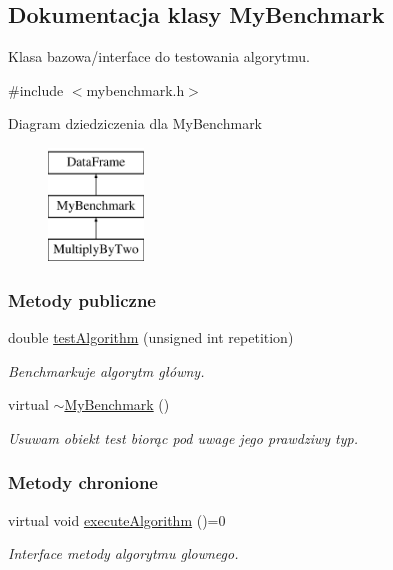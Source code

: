 \hypertarget{class_my_benchmark}{\subsection{Dokumentacja klasy My\-Benchmark}
\label{class_my_benchmark}
}


Klasa bazowa/interface do testowania algorytmu.  




{\ttfamily \#include $<$mybenchmark.\-h$>$}

Diagram dziedziczenia dla My\-Benchmark\begin{figure}[H]
\begin{center}
\leavevmode
\includegraphics[height=3.000000cm]{class_my_benchmark}
\end{center}
\end{figure}
\subsubsection*{Metody publiczne}
\begin{DoxyCompactItemize}
\item 
double \hyperlink{class_my_benchmark_a66576625ca37f8bc539c18ffceb69c9c}{test\-Algorithm} (unsigned int repetition)
\begin{DoxyCompactList}\small\item\em Benchmarkuje algorytm główny. \end{DoxyCompactList}\item 
virtual \hyperlink{class_my_benchmark_a00de82c40680b41065eb402ac90f1736}{$\sim$\-My\-Benchmark} ()
\begin{DoxyCompactList}\small\item\em Usuwam obiekt test biorąc pod uwage jego prawdziwy typ. \end{DoxyCompactList}\end{DoxyCompactItemize}
\subsubsection*{Metody chronione}
\begin{DoxyCompactItemize}
\item 
virtual void \hyperlink{class_my_benchmark_aaebbb9785ed7c460e33459464655a611}{execute\-Algorithm} ()=0
\begin{DoxyCompactList}\small\item\em Interface metody algorytmu glownego. \end{DoxyCompactList}\end{DoxyCompactItemize}
